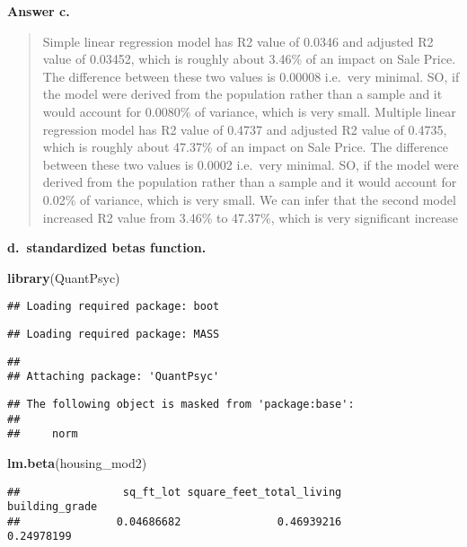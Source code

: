 \documentclass[
]{article}
\newenvironment{Shaded}{\begin{snugshade}}{\end{snugshade}}
\newcommand{\KeywordTok}[1]{\textcolor[rgb]{0.13,0.29,0.53}{\textbf{#1}}}
\newcommand{\NormalTok}[1]{#1}
\begin{document}
\textbf{Answer c.}

\begin{quote}
Simple linear regression model has R2 value of 0.0346 and adjusted R2
value of 0.03452, which is roughly about 3.46\% of an impact on Sale
Price. The difference between these two values is 0.00008 i.e.~very
minimal. SO, if the model were derived from the population rather than a
sample and it would account for 0.0080\% of variance, which is very
small. Multiple linear regression model has R2 value of 0.4737 and
adjusted R2 value of 0.4735, which is roughly about 47.37\% of an impact
on Sale Price. The difference between these two values is 0.0002
i.e.~very minimal. SO, if the model were derived from the population
rather than a sample and it would account for 0.02\% of variance, which
is very small. We can infer that the second model increased R2 value
from 3.46\% to 47.37\%, which is very significant increase
\end{quote}

\textbf{d.~standardized betas function. }

\begin{Shaded}
\begin{Highlighting}[]
\KeywordTok{library}\NormalTok{(QuantPsyc)}
\end{Highlighting}
\end{Shaded}

\begin{verbatim}
## Loading required package: boot
\end{verbatim}

\begin{verbatim}
## Loading required package: MASS
\end{verbatim}

\begin{verbatim}
## 
## Attaching package: 'QuantPsyc'
\end{verbatim}

\begin{verbatim}
## The following object is masked from 'package:base':
## 
##     norm
\end{verbatim}

\begin{Shaded}
\begin{Highlighting}[]
\KeywordTok{lm.beta}\NormalTok{(housing_mod2)}
\end{Highlighting}
\end{Shaded}

\begin{verbatim}
##                sq_ft_lot square_feet_total_living           building_grade 
##               0.04686682               0.46939216               0.24978199
\end{verbatim}
\end{document}
